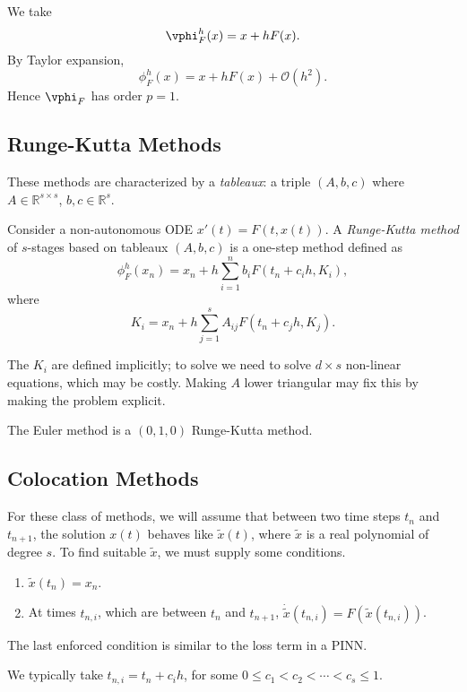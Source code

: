 \documentclass[12pt]{article}
\begin{document}
\begin{exbox}
	We take
	\[
	\vphi_F^h(x) = x + h F(x).
	\]
	By Taylor expansion,
	\[
	\phi_F^h(x) = x + h F(x) + \mathcal{O}(h^2).
	\]
	Hence $\vphi_F$ has order $p = 1$.
\end{exbox}

\subsection{Runge-Kutta Methods}%
\label{sub:rkm}

These methods are characterized by a \emph{tableaux}: a triple $(A, b, c)$ where $A \in \mathbb{R}^{s \times s}$, $b, c \in \mathbb{R}^{s}$.

\begin{definition}
	Consider a non-autonomous ODE $x'(t) = F(t, x(t))$. A \emph{Runge-Kutta method} of $s$-stages based on tableaux $(A, b, c)$ is a one-step method defined as
	\[
	\phi_F^{h}(x_n) = x_n + h \sum_{i = 1}^n b_i F(t_n + c_i h, K_i),
	\]
	where
	\[
	K_i = x_n + h \sum_{j=1}^s A_{ij} F(t_n + c_j h, K_j).
	\]
\end{definition}
The $K_i$ are defined implicitly; to solve we need to solve $d \times s$ non-linear equations, which may be costly. Making $A$ lower triangular may fix this by making the problem explicit.

The Euler method is a $(0, 1, 0)$ Runge-Kutta method.

\subsection{Colocation Methods}%
\label{sub:cm}

For these class of methods, we will assume that between two time steps $t_n$ and $t_{n+1}$, the solution $x(t)$ behaves like $\tilde x(t)$, where $\tilde x$ is a real polynomial of degree $s$. To find suitable $\tilde x$, we must supply some conditions.
\begin{enumerate}
	\item $\tilde x(t_n) = x_n$.
	\item At times $t_{n,i}$, which are between $t_n$ and $t_{n+1}$, $\dot{\tilde x}(t_{n,i}) = F(\tilde x(t_{n,i}))$.
\end{enumerate}
The last enforced condition is similar to the loss term in a PINN.

We typically take $t_{n,i} = t_n + c_i h$, for some $0 \leq c_1 < c_2 < \cdots < c_s \leq 1$.
\end{document}
